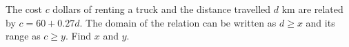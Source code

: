 The cost $c$ dollars of renting a truck and the distance travelled $d$ km are related by $c=60+0.27d$. The domain of the relation can be written as $d\ge x$ and its range as $c\ge y$. Find $x$ and $y$.
